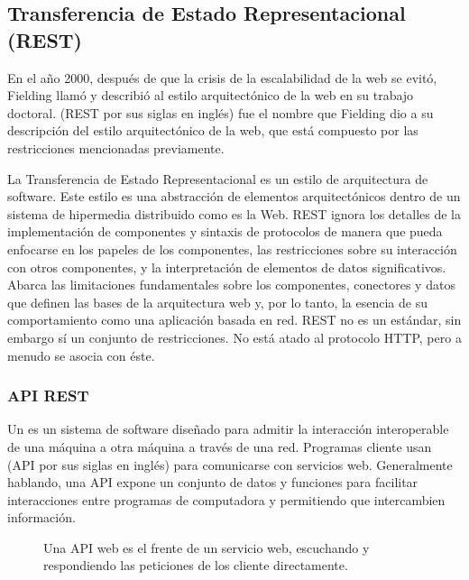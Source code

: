 \subsection{Transferencia de Estado Representacional (REST)}
\label{\detokenize{chapter_one/rest:transferencia-de-estado-representacional-rest}}
En el año 2000, después de que la crisis de la escalabilidad de la web se
evitó, Fielding llamó y describió al estilo arquitectónico de la web en su
trabajo doctoral.  (REST por
sus siglas en inglés) fue el nombre que Fielding dio a su descripción del
estilo arquitectónico de la web, que está compuesto por las restricciones
mencionadas previamente.

La Transferencia de Estado Representacional es un estilo de arquitectura de software.
Este estilo es
una abstracción de elementos arquitectónicos dentro de un sistema de hipermedia
distribuido como es la Web. REST ignora los detalles de la implementación de
componentes y sintaxis de protocolos de manera que pueda enfocarse en los
papeles de los componentes, las restricciones sobre su interacción con otros
componentes, y la interpretación de elementos de datos significativos.
Abarca las limitaciones fundamentales sobre los componentes, conectores y datos
que definen las bases de la arquitectura web y, por lo tanto, la esencia de su
comportamiento como una aplicación basada en red. REST no es un estándar, sin
embargo sí un conjunto de restricciones. No está atado al protocolo HTTP,
pero a menudo se asocia con éste.


\subsubsection{API REST}
\label{\detokenize{chapter_one/rest:api-rest}}
Un  es un sistema de software diseñado para admitir
la interacción interoperable de una máquina a otra  máquina a través de una red.
Programas cliente usan  (API
por sus siglas en inglés) para comunicarse con servicios web. Generalmente
hablando, una API expone un conjunto de datos y funciones para facilitar
interacciones entre programas de computadora y permitiendo que
intercambien información.

\begin{figure}[htbp]
\centering
\capstart

\noindent{}
\caption{Una API web es el frente de un servicio web, escuchando y respondiendo las peticiones de los cliente directamente.}\label{\detokenize{chapter_one/rest:web-service-cycle}}\end{figure}

